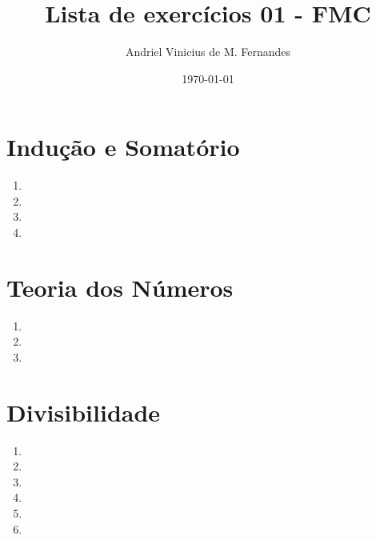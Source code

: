 \documentclass[12pt]{article}
\title{Lista de exercícios 01 - FMC}
\author{Andriel Vinicius de M. Fernandes}
\date{\today}
\begin{document}
\maketitle
\section{Indução e Somatório}
\begin{enumerate}
	\item 
	\item 
	\item 
	\item 
\end{enumerate}
\section{Teoria dos Números}
\begin{enumerate}
	\item 
	\item 
	\item 
\end{enumerate}
\section{Divisibilidade}
\begin{enumerate}
	\item 
	\item 
	\item 
	\item 
	\item 
	\item 
\end{enumerate}
\end{document}
